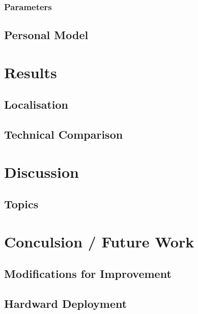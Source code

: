 \documentclass[a4paper]{article}
\begin{document}
\subsubsection{Parameters}

\subsection{Personal Model}

\section{Results}
\subsection{Localisation}
\subsection{Technical Comparison}

\section{Discussion}

\subsection{Topics}

\section{Conculsion / Future Work}
\subsection{Modifications for Improvement}
\subsection{Hardward Deployment}



\end{document}

